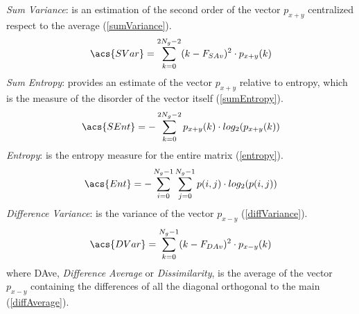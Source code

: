\documentclass[final,a4paper,12pt,english]{UnicaPhdThesis3}
\begin{document}
\textit{Sum Variance}: is an estimation of the second order of the vector $p_{x+y}$ centralized respect to the average (\ref{sumVariance}).
\begin{equation}\label{sumVariance}
\acs{SVar}=\sum_{k=0}^{2N_{g}-2}(k - F_{SAv})^2 \cdot p_{x+y}(k)
\end{equation}
\textit{Sum Entropy}: provides an estimate of the vector $p_{x+y}$ relative to entropy, which is the measure of the disorder of the vector itself (\ref{sumEntropy}).
\begin{equation}\label{sumEntropy}
\acs{SEnt}=-\sum_{k=0}^{2N_{g}-2}p_{x+y}(k)\cdot log_2(p_{x+y}(k))
\end{equation}
\textit{Entropy}: is the entropy measure for the entire matrix (\ref{entropy}).
\begin{equation}\label{entropy}
\acs{Ent}=-\sum_{i=0}^{N_{g}-1}\sum_{j=0}^{N_{g}-1} p(i,j)\cdot log_2(p(i,j))
\end{equation}
\textit{Difference Variance}: is the variance of the vector $p_{x-y}$ (\ref{diffVariance}).
\begin{equation}\label{diffVariance}
\acs{DVar}=\sum_{k=0}^{N_{g}-1}(k - F_{DAv})^2 \cdot p_{x-y}(k)
\end{equation}
where \acs{DAve}, \textit{Difference Average} or \textit{Dissimilarity}, is the average of the vector $p_{x-y}$ containing the differences of all the diagonal orthogonal to the main (\ref{diffAverage}).
\end{document}
